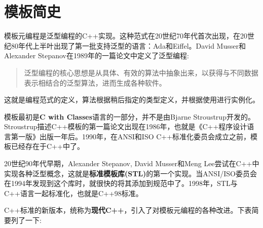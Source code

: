 \section{模板简史}
模板元编程是泛型编程的C++实现。这种范式在20世纪70年代首次出现，在20世纪80年代上半叶出现了第一批支持泛型的语言：Ada和Eiffel。David Musser和Alexander Stepanov在1989年的一篇论文中定义了泛型编程:

\begin{quote}
泛型编程的核心思想是从具体、有效的算法中抽象出来，以获得与不同数据表示相结合的泛型算法，进而生成各种软件。
\end{quote}

这就是编程范式的定义，算法根据稍后指定的类型定义，并根据使用进行实例化。

模板最初是\textbf{C with Classes}语言的一部分，并不是由Bjarne Stroustrup开发的。Stroustrup描述C++模板的第一篇论文出现在1986年，也就是《C++程序设计语言第一版》出版一年后。1990年，在ANSI和ISO C++标准化委员会成立之前，模板已经存在于C++中了。

20世纪90年代早期，Alexander Stepanov, David Musser和Meng Lee尝试在C++中实现各种泛型概念，这就是\textbf{标准模板库(STL)}的第一个实现。当ANSI/ISO委员会在1994年发现到这个库时，就很快的将其添加到规范中了。1998年，STL与C++语言一起标准化，也就是C++98标准。

C++标准的新版本，统称为\textbf{现代C++}，引入了对模板元编程的各种改进。下表简要列了一下:

